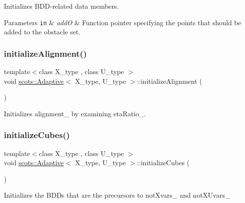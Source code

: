 Initializes B\+D\+D-\/related data members. 
\begin{DoxyParams}[1]{Parameters}
\mbox{\tt in}  & {\em addO} & Function pointer specifying the points that should be added to the obstacle set. \\
\hline
\end{DoxyParams}
\mbox{\label{classscots_1_1Adaptive_a8f23922cbd2768a8339c73928ddc9c5a}} 
\subsubsection{\texorpdfstring{initialize\+Alignment()}{initializeAlignment()}}
{\footnotesize\ttfamily template$<$class X\+\_\+type , class U\+\_\+type $>$ \\
void \hyperlink{classscots_1_1Adaptive}{scots\+::\+Adaptive}$<$ X\+\_\+type, U\+\_\+type $>$\+::initialize\+Alignment (\begin{DoxyParamCaption}{ }\end{DoxyParamCaption})\hspace{0.3cm}{\ttfamily [inline]}}

Initializes alignment\+\_\+ by examining eta\+Ratio\+\_\+. \mbox{\label{classscots_1_1Adaptive_a2b4a5e42c1a4fca883c132b02295bf11}} 
\subsubsection{\texorpdfstring{initialize\+Cubes()}{initializeCubes()}}
{\footnotesize\ttfamily template$<$class X\+\_\+type , class U\+\_\+type $>$ \\
void \hyperlink{classscots_1_1Adaptive}{scots\+::\+Adaptive}$<$ X\+\_\+type, U\+\_\+type $>$\+::initialize\+Cubes (\begin{DoxyParamCaption}{ }\end{DoxyParamCaption})\hspace{0.3cm}{\ttfamily [inline]}}

Initializes the B\+D\+Ds that are the precursors to not\+Xvars\+\_\+ and not\+X\+Uvars\+\_\+ \mbox{\label{classscots_1_1Adaptive_a655af3ff313bd74cca9896846d71680d}} 
